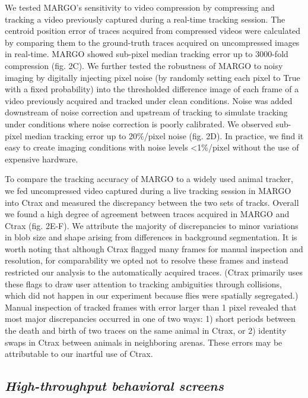 \documentclass[10pt]{article}
\begin{document}
\begin{multicols}{2}
We tested MARGO's sensitivity to video compression by compressing and tracking a video previously captured during a real-time tracking session. The centroid position error of traces acquired from compressed videos were calculated by comparing them to the ground-truth traces acquired on uncompressed images in real-time. MARGO showed sub-pixel median tracking error up to 3000-fold compression (fig. 2C). We further tested the robustness of MARGO to noisy imaging by digitally injecting pixel noise (by randomly setting each pixel to True with a fixed probability) into the thresholded difference image of each frame of a video previously acquired and tracked under clean conditions. Noise was added downstream of noise correction and upstream of tracking to simulate tracking under conditions where noise correction is poorly calibrated. We observed sub-pixel median tracking error up to 20\%/pixel noise (fig. 2D). In practice, we find it easy to create imaging conditions with noise levels <1\%/pixel without the use of expensive hardware.

To compare the tracking accuracy of MARGO to a widely used animal tracker, we fed uncompressed video captured during a live tracking session in MARGO into Ctrax\cite{Branson_High_2009} and measured the discrepancy between the two sets of tracks. Overall we found a high degree of agreement between traces acquired in MARGO and Ctrax (fig. 2E-F). We attribute the majority of discrepancies to minor variations in blob size and shape arising from differences in background segmentation. It is worth noting that although Ctrax flagged many frames for manual inspection and resolution, for comparability we opted not to resolve these frames and instead restricted our analysis to the automatically acquired traces. (Ctrax primarily uses these flags to draw user attention to tracking ambiguities through collisions, which did not happen in our experiment because flies were spatially segregated.) Manual inspection of tracked frames with error larger than 1 pixel revealed that most major discrepancies occurred in one of two ways: 1) short periods between the death and birth of two traces on the same animal in Ctrax, or 2) identity swaps in Ctrax between animals in neighboring arenas. These errors may be attributable to our inartful use of Ctrax.

\subsection*{\textit{High-throughput behavioral screens}}


\end{multicols}
\end{document}

